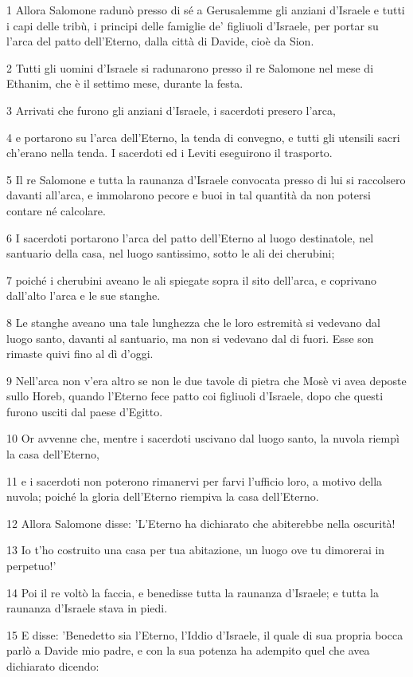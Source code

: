 \par 1 Allora Salomone radunò presso di sé a Gerusalemme gli anziani d'Israele e tutti i capi delle tribù, i principi delle famiglie de' figliuoli d'Israele, per portar su l'arca del patto dell'Eterno, dalla città di Davide, cioè da Sion.
\par 2 Tutti gli uomini d'Israele si radunarono presso il re Salomone nel mese di Ethanim, che è il settimo mese, durante la festa.
\par 3 Arrivati che furono gli anziani d'Israele, i sacerdoti presero l'arca,
\par 4 e portarono su l'arca dell'Eterno, la tenda di convegno, e tutti gli utensili sacri ch'erano nella tenda. I sacerdoti ed i Leviti eseguirono il trasporto.
\par 5 Il re Salomone e tutta la raunanza d'Israele convocata presso di lui si raccolsero davanti all'arca, e immolarono pecore e buoi in tal quantità da non potersi contare né calcolare.
\par 6 I sacerdoti portarono l'arca del patto dell'Eterno al luogo destinatole, nel santuario della casa, nel luogo santissimo, sotto le ali dei cherubini;
\par 7 poiché i cherubini aveano le ali spiegate sopra il sito dell'arca, e coprivano dall'alto l'arca e le sue stanghe.
\par 8 Le stanghe aveano una tale lunghezza che le loro estremità si vedevano dal luogo santo, davanti al santuario, ma non si vedevano dal di fuori. Esse son rimaste quivi fino al dì d'oggi.
\par 9 Nell'arca non v'era altro se non le due tavole di pietra che Mosè vi avea deposte sullo Horeb, quando l'Eterno fece patto coi figliuoli d'Israele, dopo che questi furono usciti dal paese d'Egitto.
\par 10 Or avvenne che, mentre i sacerdoti uscivano dal luogo santo, la nuvola riempì la casa dell'Eterno,
\par 11 e i sacerdoti non poterono rimanervi per farvi l'ufficio loro, a motivo della nuvola; poiché la gloria dell'Eterno riempiva la casa dell'Eterno.
\par 12 Allora Salomone disse: 'L'Eterno ha dichiarato che abiterebbe nella oscurità!
\par 13 Io t'ho costruito una casa per tua abitazione, un luogo ove tu dimorerai in perpetuo!'
\par 14 Poi il re voltò la faccia, e benedisse tutta la raunanza d'Israele; e tutta la raunanza d'Israele stava in piedi.
\par 15 E disse: 'Benedetto sia l'Eterno, l'Iddio d'Israele, il quale di sua propria bocca parlò a Davide mio padre, e con la sua potenza ha adempito quel che avea dichiarato dicendo:
